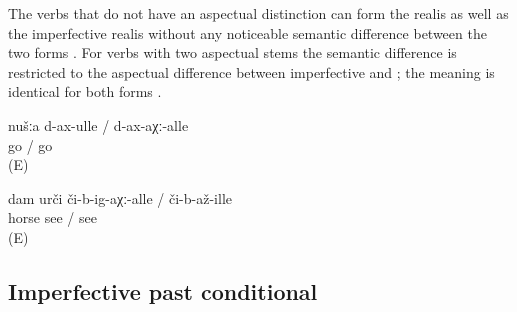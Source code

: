 The verbs that do not have an aspectual distinction can form the realis  as well as the imperfective realis  without any noticeable semantic difference between the two forms . For verbs with two aspectual stems the semantic difference is restricted to the aspectual difference between imperfective and ; the  meaning is identical for both forms .
%
\begin{exe}
	\ex	\label{ex:‎‎‎if we go (E)}
	\gll	nušːa	d-ax-ulle /		d-ax-aχː-alle\\
			go	/ go\\
	\glt	{} (E)

	\ex	\label{ex:‎ if I see the horse (regularly / once) (E)}
	\gll	dam	urči	či-b-ig-aχː-alle	\quad/	či-b-až-ille\\
			horse	see	\quad/ see\\
	\glt	{} (E)
\end{exe}



\subsection{Imperfective past conditional}
\label{sec:imperfectivepastconditional}


